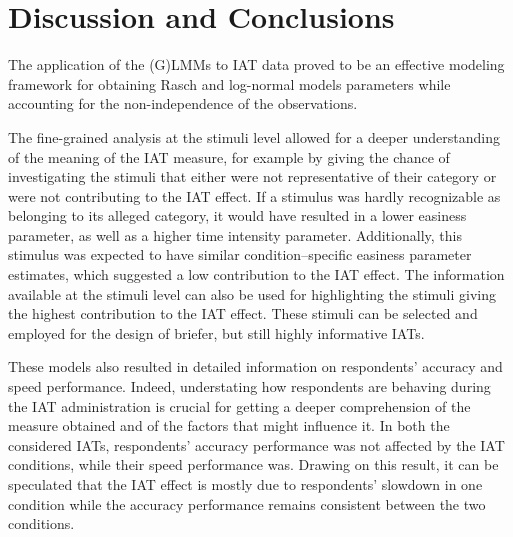 \documentclass[12pt]{book}
\begin{document}
\section{Discussion and Conclusions}


The application of the (G)LMMs to IAT data proved to be an effective modeling framework for obtaining Rasch and log-normal models parameters while accounting for the non-independence of the observations.


The fine-grained analysis at the stimuli level allowed for a deeper understanding of the meaning of the IAT measure, for example by giving the chance of investigating the stimuli that either were not representative of their category or were not contributing to the IAT effect. If a stimulus was hardly recognizable as belonging to its alleged category, it would have resulted in a lower easiness parameter, as well as a higher time intensity parameter. Additionally, this stimulus was expected to have similar condition--specific easiness parameter estimates, which suggested a low contribution to the IAT effect. The information available at the stimuli level can also be used for highlighting the stimuli giving the highest contribution to the IAT effect. These stimuli can be selected and employed for the design of briefer, but still highly informative IATs.


These models also resulted in detailed information on respondents' accuracy and speed performance. Indeed, understating how respondents are behaving during the IAT administration is crucial for getting a deeper comprehension of the measure obtained and of the factors that might influence it. In both the considered IATs, respondents' accuracy performance was not affected by the IAT conditions, while their speed performance was. Drawing on this result, it can be speculated that the IAT effect is mostly due to respondents' slowdown in one condition while the accuracy performance remains consistent between the two conditions. 
\end{document}
